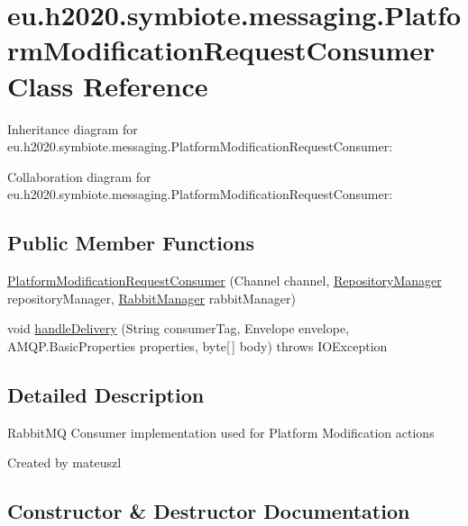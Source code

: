 \hypertarget{classeu_1_1h2020_1_1symbiote_1_1messaging_1_1PlatformModificationRequestConsumer}{}\section{eu.\+h2020.\+symbiote.\+messaging.\+Platform\+Modification\+Request\+Consumer Class Reference}
\label{classeu_1_1h2020_1_1symbiote_1_1messaging_1_1PlatformModificationRequestConsumer}


Inheritance diagram for eu.\+h2020.\+symbiote.\+messaging.\+Platform\+Modification\+Request\+Consumer\+:


Collaboration diagram for eu.\+h2020.\+symbiote.\+messaging.\+Platform\+Modification\+Request\+Consumer\+:
\subsection*{Public Member Functions}
\begin{DoxyCompactItemize}
\item 
\hyperlink{classeu_1_1h2020_1_1symbiote_1_1messaging_1_1PlatformModificationRequestConsumer_a68aef30b8dec1bfee5049027aadb0d28}{Platform\+Modification\+Request\+Consumer} (Channel channel, \hyperlink{classeu_1_1h2020_1_1symbiote_1_1repository_1_1RepositoryManager}{Repository\+Manager} repository\+Manager, \hyperlink{classeu_1_1h2020_1_1symbiote_1_1messaging_1_1RabbitManager}{Rabbit\+Manager} rabbit\+Manager)
\item 
void \hyperlink{classeu_1_1h2020_1_1symbiote_1_1messaging_1_1PlatformModificationRequestConsumer_abd849a1e55f280762f4571d4214004a3}{handle\+Delivery} (String consumer\+Tag, Envelope envelope, A\+M\+Q\+P.\+Basic\+Properties properties, byte\mbox{[}$\,$\mbox{]} body)  throws I\+O\+Exception 
\end{DoxyCompactItemize}


\subsection{Detailed Description}
Rabbit\+MQ Consumer implementation used for Platform Modification actions

Created by mateuszl 

\subsection{Constructor \& Destructor Documentation}
